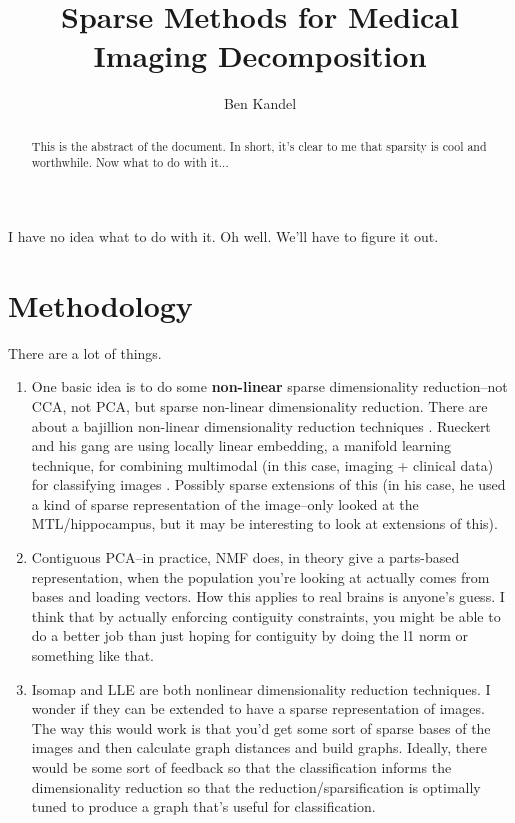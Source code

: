 \documentclass{nih}
\author{Ben Kandel}
\title{Sparse Methods for Medical Imaging Decomposition}
\begin{document}
\maketitle
\begin{abstract}
This is the abstract of the document.  In short, it's clear to me that sparsity is cool and worthwhile.  Now what to do with it...
\end{abstract}
I have no idea what to do with it. Oh well.  We'll have to figure it out. 

\section{Methodology}
There are a lot of things.  
\begin{enumerate}
\item One basic idea is to do some \textbf{non-linear} sparse dimensionality reduction--not CCA, not PCA, but sparse non-linear dimensionality reduction.  There are about a bajillion non-linear dimensionality reduction techniques \cite{van_der_maaten_dimensionality_2007}.  Rueckert and his gang are using locally linear embedding, a manifold learning technique, for combining multimodal (in this case, imaging + clinical data) for classifying images \cite{wolz_nonlinear_2012}.  Possibly sparse extensions of this (in his case, he used a kind of sparse representation of the image--only looked at the MTL/hippocampus, but it may be interesting to look at extensions of this). 
\item Contiguous PCA--in practice, NMF does, in theory \cite{donoho_when_2004} give a parts-based representation, when the population you're looking at actually comes from bases and loading vectors.  How this applies to real brains is anyone's guess.  I think that by actually enforcing contiguity constraints, you might be able to do a better job than just hoping for contiguity by doing the l1 norm or something like that. 
\item Isomap \cite{tenenbaum_global_2000} and LLE \cite{roweis_nonlinear_2000} are both nonlinear dimensionality reduction techniques.  I wonder if they can be extended to have a sparse representation of images.  The way this would work is that you'd get some sort of sparse bases of the images and then calculate graph distances and build graphs.  Ideally, there would be some sort of feedback so that the classification informs the dimensionality reduction so that the reduction/sparsification is optimally tuned to produce a graph that's useful for classification. 
\end{enumerate}
\end{document}
